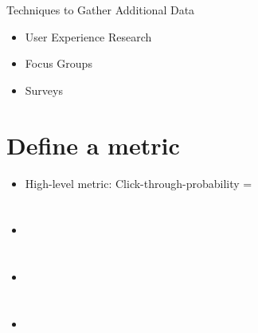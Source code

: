 \documentclass[twoside,12pt]{article}
\begin{document}
\section{}
Techniques to Gather Additional Data
\begin{itemize}
\item User Experience Research
\item Focus Groups 
\item Surveys 
\end{itemize}

\section{Define a metric}
\begin{itemize}
\item High-level metric: Click-through-probability = 
\end{itemize}

\section{}
\begin{itemize}
\item
\end{itemize}

\section{}
\begin{itemize}
\item
\end{itemize}

\section{}
\begin{itemize}
\item
\end{itemize}
\end{document}
